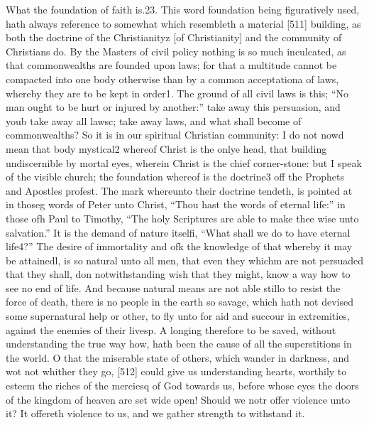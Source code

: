 What the foundation of faith is.23. This word foundation being figuratively used, hath always reference to somewhat which resembleth a material [511] building, as both the doctrine of the Christianityz [of Christianity] and the community of Christians do. By the Masters of civil policy nothing is so much inculcated, as that commonwealths are founded upon laws; for that a multitude cannot be compacted into one body otherwise than by a common acceptationa of laws, whereby they are to be kept in order1. The ground of all civil laws is this; “No man ought to be hurt or injured by another:” take away this persuasion, and youb take away all lawsc; take away laws, and what shall become of commonwealths? So it is in our spiritual Christian community: I do not nowd mean that body mystical2 whereof Christ is the onlye head, that building undiscernible by mortal eyes, wherein Christ is the chief corner-stone: but I speak of the visible church; the foundation whereof is the doctrine3 off the Prophets and Apostles profest. The mark whereunto their doctrine tendeth, is pointed at in thoseg words of Peter unto Christ, “Thou hast the words of eternal life:” in those ofh Paul to Timothy, “The holy Scriptures are able to make thee wise unto salvation.” It is the demand of nature itselfi, “What shall we do to have eternal life4?” The desire of immortality and ofk the knowledge of that whereby it may be attainedl, is so natural unto all men, that even they whichm are not persuaded that they shall, don notwithstanding wish that they might, know a way how to see no end of life. And because natural means are not able stillo to resist the force of death, there is no people in the earth so savage, which hath not devised some supernatural help or other, to fly unto for aid and succour in extremities, against the enemies of their livesp. A longing therefore to be saved, without understanding the true way how, hath been the cause of all the superstitions in the world. O that the miserable state of others, which wander in darkness, and wot not whither they go, [512] could give us understanding hearts, worthily to esteem the riches of the merciesq of God towards us, before whose eyes the doors of the kingdom of heaven are set wide open! Should we notr offer violence unto it? It offereth violence to us, and we gather strength to withstand it.

